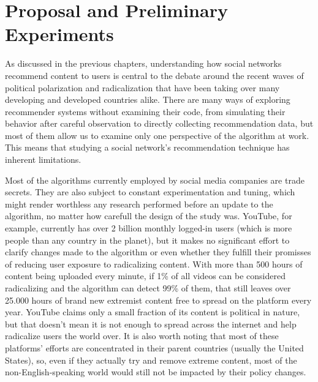 





\chapter{Proposal and Preliminary Experiments}
\label{cap:proposal}

As discussed in the previous chapters, understanding how social networks
recommend content to users is central to the debate around the recent waves of
political polarization and radicalization that have been taking over many
developing and developed countries alike. There are many ways of exploring
recommender systems without examining their code, from simulating their behavior
after careful observation to directly collecting recommendation data, but most
of them allow us to examine only one perspective of the algorithm at work. This
means that studying a social network's recommendation technique has inherent
limitations.

Most of the algorithms currently employed by social media companies are trade
secrets. They are also subject to constant experimentation and tuning, which
might render worthless any research performed before an update to the algorithm,
no matter how carefull the design of the study was. YouTube, for example,
currently has over 2 billion monthly logged-in users (which is more people than
any country in the planet), but it makes no significant effort to clarify
changes made to the algorithm or even whether they fulfill their promisses of
reducing user exposure to radicalizing content. With more than 500 hours of
content being uploaded every minute, if 1\% of all videos can be considered
radicalizing and the algorithm can detect 99\% of them, that still leaves over
25.000 hours of brand new extremist content free to spread on the platform every
year. YouTube claims only a small fraction of its content is political in
nature, but that doesn't mean it is not enough to spread across the internet and
help radicalize users the world over. It is also worth noting that most of these
platforms' efforts are concentrated in their parent countries (usually the
United States), so, even if they actually try and remove extreme content, most
of the non-English-speaking world would still not be impacted by their policy
changes.

